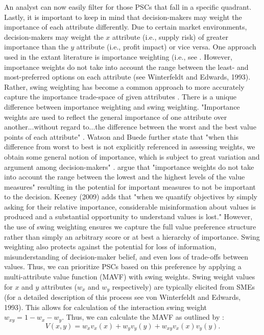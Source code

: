 \documentclass[twocolumn]{svjour3}       %
\begin{document}
An analyst can now easily filter for those PSCs that fall in a specific quadrant.  Lastly, it is important to keep in mind that decision-makers may weight the importance of each attribute differently. Due to certain market environments, decision-makers may weight the $x$ attribute (i.e., supply risk) of greater importance than the $y$ attribute (i.e., profit impact) or vice versa.  One approach used in the extant literature is importance weighting (i.e., see \citet{oe97,lx08,pwa12}.  However, importance weights do not take into account the range between the least- and most-preferred options on each attribute (see Winterfeldt and Edwards, 1993).  Rather, swing weighting has become a common approach to more accurately capture the importance trade-space of given attributes \citep{pbtj13}. There is a unique difference between importance weighting and swing weighting. "Importance weights are used to reflect the general importance of one attribute over another...without regard to...the difference between the worst and the best value points of each attribute" \citep[p. 200]{wb87}. Watson and Buede further state that "when this difference from worst to best is not explicitly referenced in assessing weights, we obtain some general notion of importance, which is subject to great variation and argument among decision-makers" \citep[p. 200]{wb87}. \citet{dpbhc08} argue that "importance weights do not take into account the range between the lowest and the highest levels of the value measures" resulting in the potential for important measures to not be important to the decision. Keeney (2009) adds that "when we quantify objectives by simply asking for their relative importance, considerable misinformation about values is produced and a substantial opportunity to understand values is lost."  However, the use of swing weighting ensures we capture the full value preference structure rather than simply an arbitrary score or at best a hierarchy of importance. Swing weighting also protects against the potential for loss of information, misunderstanding of decision-maker belief, and even loss of trade-offs between values.  Thus, we can prioritize PSCs based on this preference by applying a multi-attribute value function (MAVF) with swing weights. Swing weight values for $x$ and $y$ attributes ($w_x$ and $w_y$ respectively) are typically elicited from SMEs (for a detailed description of this process see von Winterfeldt and Edwards, 1993). This allows for calculation of the interaction swing weight $w_{xy} = 1 - w_x - w_y$. Thus, we can calculate the MAVF as outlined by \citet{kr93}:
\begin{equation}
\label{eqn:2}
V\left(x, y\right) = w_x v_x\left(x\right) + w_y v_y\left(y\right) + w_{xy} v_x\left(x\right)v_y\left(y\right).
\end{equation}
\end{document}

